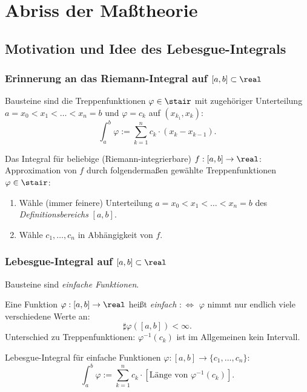 \setcounter{section}{10}
\section{Abriss der Maßtheorie}
\subsection*{Motivation und Idee des Lebesgue-Integrals}
\subsubsection*{Erinnerung an das Riemann-Integral auf $[a,b] \subset \real$}
Bausteine sind die Treppenfunktionen $\varphi \in \stair$ mit zugehöriger Unterteilung $a = x_0 < x_1 < \ldots < x_n = b$ und $\varphi = c_k$ auf $(x_{k_1},x_k)$:
\[ \int_a^b \varphi := \sum_{k=1}^n c_k \cdot (x_k - x_{k-1}). \]

Das Integral für beliebige (Riemann-integrierbare) $f:[a,b]\to\real$: Approximation von $f$ durch folgendermaßen gewählte Treppenfunktionen $\varphi \in \stair$:
\begin{enumerate}
 \item Wähle (immer feinere) Unterteilung $a = x_0 < x_1 < \ldots < x_n = b$ des \emph{Definitionsbereichs} $[a,b]$.
 \item Wähle $c_1, \ldots, c_n$ in Abhängigkeit von $f$.
\end{enumerate}

\subsubsection*{Lebesgue-Integral auf $[a,b] \subset \real$}
Bausteine sind \emph{einfache Funktionen}.

Eine Funktion $\varphi: [a,b] \to \real$ heißt \emph{einfach} $:\Leftrightarrow$ $\varphi$ nimmt nur endlich viele verschiedene Werte an:
\[ \sharp \varphi([a,b]) < \infty. \]
Unterschied zu Treppenfunktionen: $\varphi^{-1}(c_k)$ ist im Allgemeinen kein Intervall.

Lebesgue-Integral für einfache Funktionen $\varphi:[a,b] \to \{ c_1, \ldots, c_n \}$:
\[ \int_a^b \varphi := \sum_{k=1}^n c_k \cdot [ \text{Länge von } \varphi^{-1}(c_k) ]. \]


